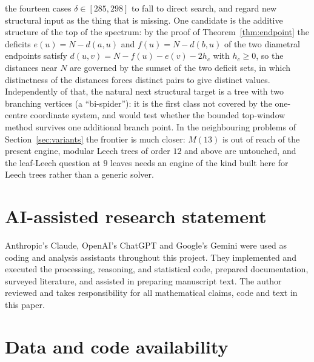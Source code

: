 \documentclass[11pt,a4paper]{article}
\theoremstyle{plain}
\theoremstyle{remark}
\begin{document}
the fourteen cases $\delta\in[285,298]$ to fall to direct search, and regard
new structural input as the thing that is missing.
One candidate is the additive structure of the top of the spectrum: by the proof
of Theorem~\ref{thm:endpoint} the deficits $e(u)=N-d(a,u)$ and $f(u)=N-d(b,u)$
of the two diametral endpoints satisfy $d(u,v)=N-f(u)-e(v)-2h_c$ with
$h_c\ge0$, so the distances near $N$ are governed by the sumset of the two
deficit sets, in which distinctness of the distances forces distinct pairs to
give distinct values.  Independently of that, the natural next
structural target is a tree
with two branching vertices (a ``bi-spider''): it is the first class not covered
by the one-centre coordinate system, and would test whether the bounded
top-window method survives one additional branch point.  In the neighbouring problems of
Section~\ref{sec:variants} the frontier is much closer: $M(13)$ is out of reach of the
present engine, modular Leech trees of order $12$ and above are untouched, and
the leaf-Leech question at $9$ leaves needs an engine of the kind built here for
Leech trees rather than a generic solver.

\section{AI-assisted research statement}\label{sec:ai}

Anthropic's Claude, OpenAI's ChatGPT and Google's Gemini were used as coding
and analysis assistants throughout this project.  They implemented and executed
the processing, reasoning, and statistical code, prepared documentation,
surveyed literature, and assisted in preparing manuscript text.  The author
reviewed and takes responsibility for all mathematical claims, code and text in
this paper.

\section{Data and code availability}\label{sec:data}
\end{document}

